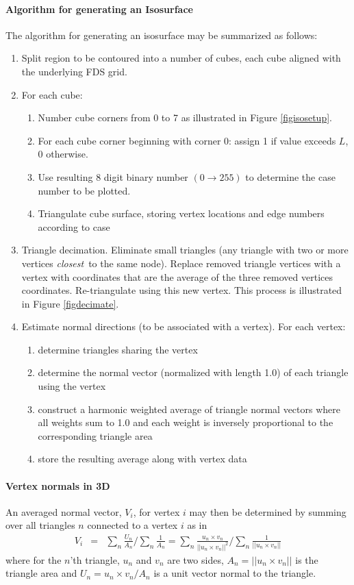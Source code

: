 \documentclass[11pt,twoside]{book}
\begin{document}
\paragraph{Algorithm for generating an Isosurface} The algorithm for generating an isosurface may be summarized as follows:
\begin{enumerate}
\item Split region to be contoured into a number of cubes, each cube aligned with the underlying FDS grid.
\item For  each cube:
\begin{enumerate}
\item Number cube corners from 0 to 7 as illustrated in Figure \ref{figisosetup}.
\item For each cube corner beginning with corner 0: assign 1 if value exceeds $L$, 0 otherwise.
\item Use resulting 8 digit binary number $(0\rightarrow 255)$ to determine the case number to be plotted.
\item Triangulate cube surface, storing vertex locations and edge numbers according to case
\end{enumerate}
\item Triangle decimation.  Eliminate small triangles (any triangle with two or more vertices {\em closest}\ to the same node).
Replace removed triangle vertices with a vertex with coordinates that are the average of the three removed vertices coordinates.  Re-triangulate using this new vertex.  This process is illustrated in Figure \ref{figdecimate}.
\item Estimate normal directions (to be associated with a vertex).  For each vertex:
\begin{enumerate}
\item determine triangles sharing the vertex
\item determine the normal vector (normalized with length 1.0) of each triangle using the vertex
\item construct a harmonic weighted average of triangle normal vectors where all weights sum to 1.0 and each weight is inversely proportional to the corresponding triangle area
\item store the resulting average along with vertex data
\end{enumerate}
\end{enumerate}

\paragraph{Vertex normals in 3D} An averaged normal vector, $V_i$, for vertex $i$ may then be determined by summing over all triangles $n$ connected to a vertex $i$ as in
\begin{eqnarray}
V_{i}&=&\sum_n\frac{U_n}{A_n}/\sum_n\frac{1}{A_n}
=\sum_n\frac{u_n\times v_n}{||u_n\times v_n||^2}/\sum_n\frac{1}{||u_n\times v_n||}
\end{eqnarray}
where for the $n$'th triangle, $u_n$ and $v_n$ are two sides, $A_n=||u_n\times v_n||$ is the triangle area and $U_n=u_n\times v_n/A_n$ is a unit vector normal to the triangle.
\end{document}
